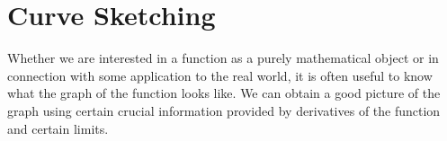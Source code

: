 \chapter{Curve Sketching}

Whether we are interested in a function as a purely mathematical
object or in connection with some application to the real world, it is
often useful to know what the graph of the function looks like.
We can obtain a good picture of the
graph using certain crucial information provided by derivatives of the
function and certain limits.







